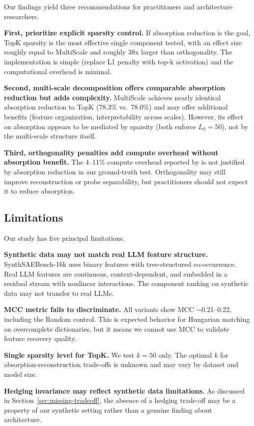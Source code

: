 \documentclass{article}
\begin{document}
Our findings yield three recommendations for practitioners and architecture researchers.

\textbf{First, prioritize explicit sparsity control.} If absorption reduction is the goal, TopK sparsity is the most effective single component tested, with an effect size roughly equal to MultiScale and roughly 38x larger than orthogonality. The implementation is simple (replace L1 penalty with top-k activation) and the computational overhead is minimal.

\textbf{Second, multi-scale decomposition offers comparable absorption reduction but adds complexity.} MultiScale achieves nearly identical absorption reduction to TopK (78.3\% vs.~78.0\%) and may offer additional benefits (feature organization, interpretability across scales). However, its effect on absorption appears to be mediated by sparsity (both enforce $L_0 = 50$), not by the multi-scale structure itself.

\textbf{Third, orthogonality penalties add compute overhead without absorption benefit.} The 4--11\% compute overhead reported by \citet{korznikov2025ortsae} is not justified by absorption reduction in our ground-truth test. Orthogonality may still improve reconstruction or probe separability, but practitioners should not expect it to reduce absorption.

\subsection{Limitations}

Our study has five principal limitations.

\textbf{Synthetic data may not match real LLM feature structure.} SynthSAEBench-16k uses binary features with tree-structured co-occurrence. Real LLM features are continuous, context-dependent, and embedded in a residual stream with nonlinear interactions. The component ranking on synthetic data may not transfer to real LLMs.

\textbf{MCC metric fails to discriminate.} All variants show MCC $\sim$0.21--0.22, including the Random control. This is expected behavior for Hungarian matching on overcomplete dictionaries, but it means we cannot use MCC to validate feature recovery quality.

\textbf{Single sparsity level for TopK.} We test $k = 50$ only. The optimal $k$ for absorption-reconstruction trade-offs is unknown and may vary by dataset and model size.

\textbf{Hedging invariance may reflect synthetic data limitations.} As discussed in Section~\ref{sec:missing-tradeoff}, the absence of a hedging trade-off may be a property of our synthetic setting rather than a genuine finding about architecture.
\end{document}
